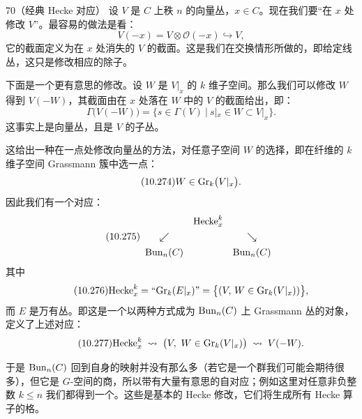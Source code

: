 \begin{srcex}{70}（经典 Hecke 对应）
设 $V$ 是 $C$ 上秩 $n$ 的向量丛，$x\in C$。现在我们要“在 $x$ 处修改 $V$”。最容易的做法是看：
\begin{equation}\tag{10.272}
V(-x)=V\otimes\mathcal{O}(-x)\hookrightarrow V,
\end{equation}
它的截面定义为在 $x$ 处消失的 $V$ 的截面。这是我们在交换情形所做的，即给定线丛，这只是修改相应的除子。

下面是一个更有意思的修改。设 $W$ 是 $V|_x$ 的 $k$ 维子空间。那么我们可以修改 $W$ 得到 $V(-W)$，其截面由在 $x$ 处落在 $W$ 中的 $V$ 的截面给出，即：
\begin{equation}\tag{10.273}
\Gamma\big(V(-W)\big)=\big\{s\in\Gamma(V)\ \big|\ s|_x\in W\subset V|_x\big\}.
\end{equation}
这事实上是向量丛，且是 $V$ 的子丛。

这给出一种在一点处修改向量丛的方法，对任意子空间 $W$ 的选择，即在纤维的 $k$ 维子空间 Grassmann 簇中选一点：
\begin{equation}\tag{10.274}
W\in\mathrm{Gr}_k\big(V|_x\big).
\end{equation}
因此我们有一个对应：
\begin{equation}\tag{10.275}
\begin{array}{ccc}
& \mathrm{Hecke}^{k}_x &\\[4pt]
\swarrow & & \searrow\\[4pt]
\mathrm{Bun}_n(C) & & \mathrm{Bun}_n(C)
\end{array}
\end{equation}
其中
\begin{equation}\tag{10.276}
\mathrm{Hecke}^{k}_x=\text{“}\mathrm{Gr}_k(E|_x)\text{”}=\big\{(V,\,W\in\mathrm{Gr}_k(V|_x))\big\},
\end{equation}
而 $E$ 是万有丛。即这是一个以两种方式成为 $\mathrm{Bun}_n(C)$ 上 Grassmann 丛的对象，定义了上述对应：
\begin{equation}\tag{10.277}
\mathrm{Hecke}^{k}_x\;\rightsquigarrow\;
\big(V,\ W\in\mathrm{Gr}_k(V|_x)\big)\;\rightsquigarrow\;V(-W).
\end{equation}
\end{srcex}
于是 $\mathrm{Bun}_n(C)$ 回到自身的映射并没有那么多（若它是一个群我们可能会期待很多），但它是 $G$-空间的商，所以带有大量有意思的自对应；例如这里对任意非负整数 $k\le n$ 我们都得到一个。这些是基本的 Hecke 修改，它们将生成所有 Hecke 算子的格。


